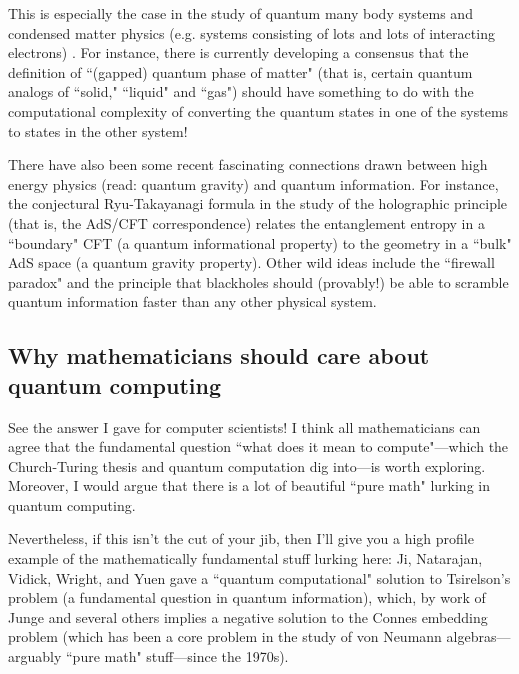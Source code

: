 \documentclass{article}
\begin{document}
This is especially the case in the study of quantum many body systems and condensed matter physics  (e.g. systems consisting of lots and lots of interacting electrons) .  For instance, there is currently developing a consensus that the definition of ``(gapped) quantum phase of matter" (that is, certain quantum analogs of ``solid," ``liquid" and ``gas") should have something to do with the computational complexity of converting the quantum states in one of the systems to states in the other system! 

There have also been some recent fascinating connections drawn between high energy physics (read: quantum gravity) and quantum information.  For instance, the conjectural Ryu-Takayanagi formula in the study of the holographic principle (that is, the AdS/CFT correspondence) relates the entanglement entropy in a ``boundary" CFT (a quantum informational property) to the  geometry in a ``bulk" AdS space (a quantum gravity property).  Other wild ideas include the ``firewall paradox" and the principle that blackholes should (provably!) be able to scramble quantum information faster than any other physical system.

\subsection{Why mathematicians should care about quantum computing}
See the answer I gave for computer scientists!  I think all mathematicians can agree that the fundamental question ``what does it mean to compute"---which the Church-Turing thesis and quantum computation dig into---is worth exploring.  Moreover, I would argue that there is a lot of beautiful ``pure math" lurking in quantum computing.

Nevertheless, if this isn't the cut of your jib, then I'll give you a high profile example of the mathematically fundamental stuff lurking here: Ji, Natarajan, Vidick, Wright, and Yuen gave a ``quantum computational" solution to Tsirelson's problem (a fundamental question in quantum information), which, by work of Junge and several others implies a negative solution to the Connes embedding problem (which has been a core problem in the study of von Neumann algebras---arguably ``pure math" stuff---since the 1970s).
\end{document}
